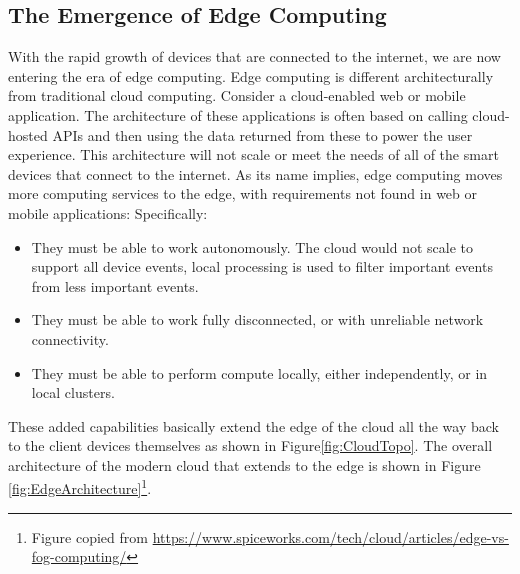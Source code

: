 \documentclass[conference]{IEEEconf}
\begin{document}
\begin{itemize}
\end{itemize}


\subsection{The Emergence of Edge Computing}

With the rapid growth of devices that are connected to the internet, we are now entering the era of edge computing\cite{edgecomputing}. Edge computing is  different architecturally from traditional cloud computing.  Consider a cloud-enabled web or mobile application.  The architecture of these applications is often based on calling cloud-hosted APIs and then using the data returned from these to power the user experience.  This architecture will not scale or meet the needs of all of the smart devices that connect to the internet.  As its name implies, edge computing moves more computing services to the edge, with requirements not found in web or mobile applications:  Specifically:

\begin{itemize}
	\item They must be able to work autonomously. The cloud would not scale to support all device events, local processing is used to filter important events from less important events.
	
	\item They must be able to work fully disconnected, or with unreliable network connectivity.  
	
	\item They must be able to perform compute locally, either independently, or in local clusters. 
\end{itemize}

These added capabilities basically extend the edge of the cloud all the way back to the client devices themselves as shown in Figure\ref{fig:CloudTopo}. The overall architecture of the modern cloud that extends to the edge is shown in Figure \ref{fig:EdgeArchitecture}\footnote{Figure copied from \url{https://www.spiceworks.com/tech/cloud/articles/edge-vs-fog-computing/}}.
\end{document}
